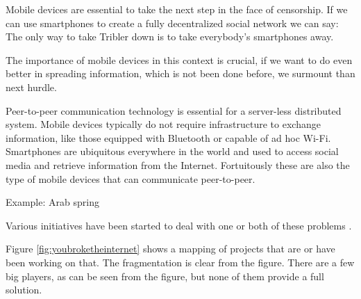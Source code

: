 Mobile devices are essential to take the next step in the face of censorship.
If we can use smartphones to create a fully decentralized social network we can say:
The only way to take Tribler down is to take everybody's smartphones away.

The importance of mobile devices in this context is crucial, if we want to do even better in spreading information, which is not been done before, we surmount than next hurdle.

Peer-to-peer communication technology is essential for a server-less distributed system.
Mobile devices typically do not require infrastructure to exchange information, like those equipped with Bluetooth or capable of ad hoc Wi-Fi.
Smartphones are ubiquitous everywhere in the world and used to access social media and retrieve information from the Internet.
Fortuitously these are also the type of mobile devices that can communicate peer-to-peer.

Example: Arab spring \cite{pouwelse2012censorshipfree}


Various initiatives have been started to deal with one or both of these problems \cite{redecentralize2015alternativeinternet}.

Figure \ref{fig:youbroketheinternet} shows a mapping of projects that are or have been working on that.
The fragmentation is clear from the figure.
There are a few big players, as can be seen from the figure, but none of them provide a full solution.






